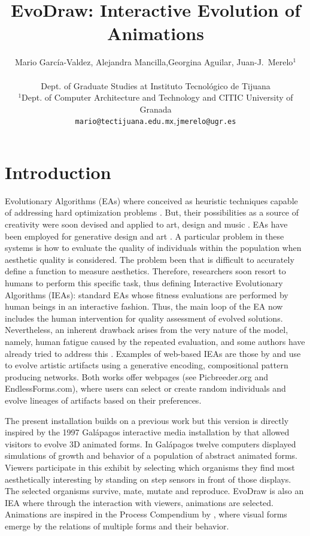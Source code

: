 \documentclass[letterpaper]{article}
\title{EvoDraw: Interactive Evolution of Animations}
\author{ Mario Garc\'ia-Valdez, Alejandra Mancilla,Georgina Aguilar, Juan-J.~Merelo$^1$\\
\mbox{}\\
Dept. of Graduate Studies at Instituto Tecnol\'ogico de Tijuana \\
$^1$Dept. of Computer Architecture and Technology and CITIC University of Granada \\
{\tt mario@tectijuana.edu.mx},{\tt jmerelo@ugr.es}}
\begin{document}
\maketitle


\section{Introduction} 

Evolutionary Algorithms (EAs) where conceived as heuristic techniques 
capable of addressing hard optimization problems 
\citep{DBLP:books/daglib/0015527}. But, their possibilities as a source of
creativity were soon devised and applied to art, design and music \citep{ie1}. 
EAs have been employed for generative design and
art \citep{Bentley:1999:intro,Sims:1991,todd:1992}.  A particular problem in
these systems is how to evaluate the quality of individuals within the population
when aesthetic quality is considered. The problem been that is difficult to
accurately define a function to measure aesthetics. Therefore, researchers
soon resort to humans to perform this specific task, thus defining Interactive
Evolutionary Algorithms (IEAs): standard EAs whose fitness evaluations are
performed by human beings in an interactive fashion. Thus, the main loop of the
EA now includes the human intervention for quality assessment of evolved solutions.
Nevertheless, an inherent drawback arises from the very nature of the model,
namely, human fatigue caused by the repeated evaluation, and some authors have
already tried to address this \citep{Frade:2010:EvoGAMES}. Examples of web-based IEAs are
those by \cite{picbreeder} and \cite{forms}
use  to evolve artistic artifacts using a generative encoding, compositional
pattern producing networks. Both works offer webpages (see Picbreeder.org and
EndlessForms.com), where users can select or create random individuals and
evolve lineages of artifacts based on their preferences.

The present installation builds on a previous work \citep{garcia2013evospace}
but this version is directly inspired by the 1997 Galápagos interactive 
media installation by \cite{galapagos} that allowed visitors to evolve 3D animated forms.
In Gal{\'a}pagos twelve computers displayed simulations of growth and 
behavior of a population of abstract animated forms. Viewers
participate in this exhibit by selecting which organisms they find
most aesthetically interesting by standing on step sensors in front 
of those displays. The selected organisms survive, mate, mutate and 
reproduce. EvoDraw is also an IEA where through the interaction
with viewers, animations are selected. Animations are inspired in 
the Process Compendium by \cite{reas:2004}, where visual forms 
emerge by the relations of multiple forms and their behavior. 
\end{document}
